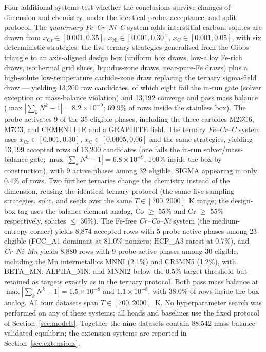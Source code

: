 \documentclass[preprint,12pt,authoryear]{elsarticle}
\newcommand{\Np}[1]{N^{#1}}
\begin{document}
Four additional systems test whether the conclusions survive changes of
dimension and chemistry, under the identical probe, acceptance, and split
protocol. The \emph{quaternary Fe--Cr--Ni--C} system adds interstitial
carbon: solutes are drawn from $x_{\mathrm{Cr}} \in [0.001, 0.35]$,
$x_{\mathrm{Ni}} \in [0.001, 0.30]$, $x_{\mathrm{C}} \in [0.001, 0.05]$,
with six deterministic strategies: the five ternary strategies generalised
from the Gibbs triangle to an axis-aligned design box (uniform box draws,
low-alloy Fe-rich draws, isothermal grid slices, liquidus-zone draws,
near-pure-Fe draws) plus a high-solute low-temperature carbide-zone draw
replacing the ternary sigma-field draw --- yielding
13{,}200 raw candidates, of which eight fail the in-run gate (solver
exception or mass-balance violation) and 13{,}192 converge and pass mass
balance
($\max |\sum_k \Np{k} - 1| = 8.2\times10^{-9}$; 69.9\% of rows inside the
stainless box). The probe activates 9 of the 35 eligible phases, including
the three carbides M23C6, M7C3, and CEMENTITE and a GRAPHITE field. The
ternary \emph{Fe--Cr--C} system uses $x_{\mathrm{Cr}} \in [0.001, 0.30]$,
$x_{\mathrm{C}} \in [0.0005, 0.06]$ and the same strategies, yielding
13{,}199 accepted rows of 13{,}200 candidates (one fails the in-run
solver/mass-balance gate; $\max |\sum_k \Np{k} - 1|
= 6.8\times10^{-9}$, 100\% inside the box by construction), with 9 active
phases among 32 eligible, SIGMA appearing in only 0.4\% of rows. Two
further ternaries change the chemistry instead of the dimension, reusing
the identical ternary protocol (the same five sampling strategies, split,
and seeds over the same $T \in [700, 2000]$~K range; the design-box tag
uses the balance-element analog, Co $\geq$ 55\% and Cr $\geq$ 55\%
respectively, solutes $\leq$ 30\%). The Fe-free \emph{Cr--Co--Ni} system
(the medium-entropy corner) yields 8{,}874 accepted rows with 5
probe-active phases among 23 eligible (FCC\_A1 dominant at 81.0\%
nonzero; HCP\_A3 rarest at 0.7\%), and \emph{Cr--Ni--Mn} yields 8{,}880
rows with 9 probe-active phases among 30 eligible, including the Mn
intermetallics MNNI (2.1\%) and CR3MN5 (1.2\%), with BETA\_MN, ALPHA\_MN,
and MNNI2 below the 0.5\% target threshold but retained as targets exactly
as in the ternary protocol. Both pass mass balance at $\max |\sum_k
\Np{k} - 1| = 1.5\times10^{-8}$ and $1.1\times10^{-8}$, with 38.0\% of
rows inside the box analog. All four datasets span $T \in [700, 2000]$~K.
No hyperparameter search was
performed on any of these systems; all heads and baselines use the fixed
protocol of Section~\ref{sec:models}. Together the nine datasets contain
88{,}542 mass-balance-validated equilibria; the extension systems are
reported in Section~\ref{sec:extensions}.
\end{document}
